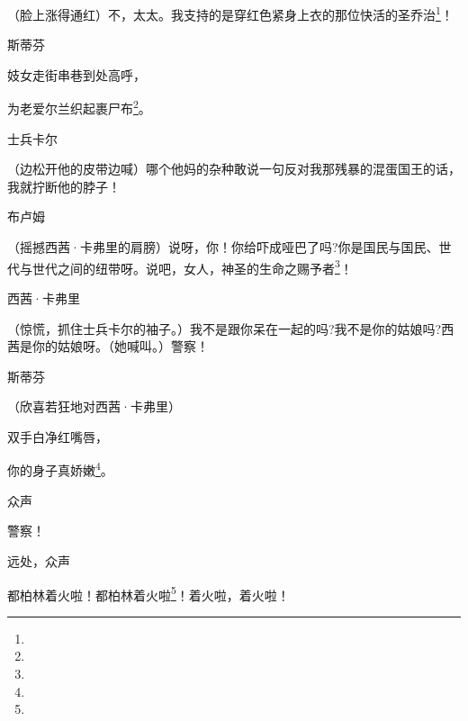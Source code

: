 \par （脸上涨得通红）不，太太。我支持的是穿红色紧身上衣的那位快活的圣乔治\footnote{}！
\par 斯蒂芬
\par 妓女走街串巷到处高呼，
\par 为老爱尔兰织起裹尸布\footnote{}。
\par 士兵卡尔
\par （边松开他的皮带边喊）哪个他妈的杂种敢说一句反对我那残暴的混蛋国王的话，我就拧断他的脖子！
\par 布卢姆
\par （摇撼西茜·卡弗里的肩膀）说呀，你！你给吓成哑巴了吗?你是国民与国民、世代与世代之间的纽带呀。说吧，女人，神圣的生命之赐予者\footnote{}！
\par 西茜·卡弗里
\par （惊慌，抓住士兵卡尔的袖子。）我不是跟你呆在一起的吗?我不是你的姑娘吗?西茜是你的姑娘呀。（她喊叫。）警察！
\par 斯蒂芬
\par （欣喜若狂地对西茜·卡弗里）
\par 双手白净红嘴唇，
\par 你的身子真娇嫩\footnote{}。
\par 众声
\par 警察！
\par 远处，众声
\par 都柏林着火啦！都柏林着火啦\footnote{}！着火啦，着火啦！
